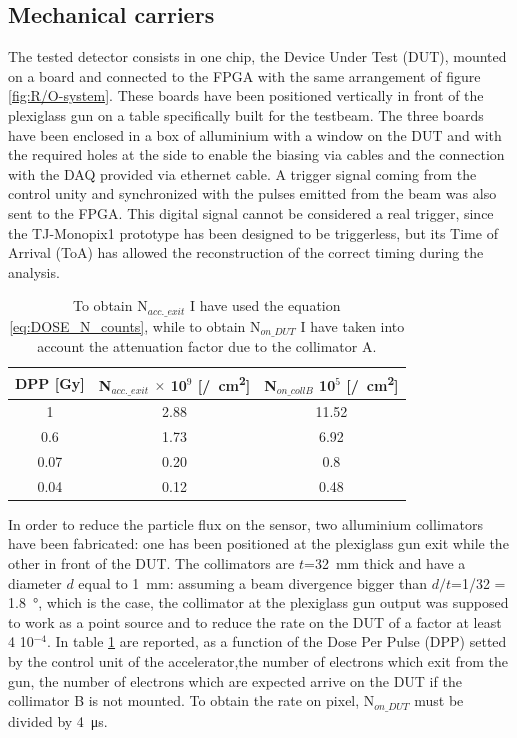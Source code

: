    \subsection{Mechanical carriers} 
      The tested detector consists in one chip, the Device Under Test (DUT), mounted on a board and connected to the FPGA with the same arrangement of figure \ref{fig:R/O-system}.
      These boards have been positioned vertically in front of the plexiglass gun on a table specifically built for the testbeam. The three boards have been enclosed in a box of alluminium with a window on the DUT and with the required holes at the side to enable the biasing via cables and the connection with the DAQ provided via ethernet cable.       
      A trigger signal coming from the control unity and synchronized with the pulses emitted from the beam was also sent to the FPGA.
      This digital signal cannot be considered a real trigger, since the TJ-Monopix1 prototype has been designed to be triggerless, but its Time of Arrival (ToA) has allowed the reconstruction of the correct timing during the analysis.
      \begin{table}
         \begin{center}
         \begin{tabular}{ c |c | c}
         DPP [\si{Gy}] & N$_{acc.\_exit}$ $\times$ 10$^{9}$ [\si{/cm\squared}] & N$_{on\_collB}$ 10$^{5}$ [\si{/cm\squared}]\\
         \hline
         1 & 2.88 & 11.52 \\ 
         0.6 & 1.73 & 6.92 \\
         0.07 & 0.20 & 0.8\\
         0.04 & 0.12 & 0.48\\
         \end{tabular}
         \caption{To obtain N$_{acc.\_exit}$ I have used the equation \ref{eq:DOSE_N_counts}, while to obtain N$_{on\_DUT}$ I have taken into account the attenuation factor due to the collimator A.}
         \label{tab:Dose_N}
         \end{center}
     \end{table}
     
      In order to reduce the particle flux on the sensor, two alluminium collimators have been fabricated: one has been positioned at the plexiglass gun exit while the other in front of the DUT. The collimators are $t$=\SI{32}{mm} thick and have a diameter $d$ equal to \SI{1}{mm}: assuming a beam divergence bigger than $d/t$=1/32 = \SI{1.8}{\degree}, which is the case, the collimator at the plexiglass gun output was supposed to work as a point source and to reduce the rate on the DUT of a factor at least 4 10${^{-4}}$. In table \ref{tab:Dose_N} are reported, as a function of the Dose Per Pulse (DPP) setted by the control unit of the accelerator,the number of electrons which exit from the gun, the number of electrons which are expected arrive on the DUT if the collimator B is not mounted. 
      To obtain the rate on pixel, N$_{on\_DUT}$ must be divided by \SI{4}{\us}.


